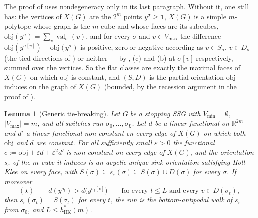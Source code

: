 \documentclass[11pt]{article}
\theoremstyle{plain}
\newtheorem{lemma}[theorem]{Lemma}
\theoremstyle{definition}
\DeclareMathOperator{\val}{val}
\newcommand{\Vmax}{V_{\max}}
\newcommand{\Vmin}{V_{\min}}
\newcommand{\bbone}{\mathbf{1}}
\begin{document}
The proof of  uses nondegeneracy only in its
last paragraph. Without it, one still has: the vertices of $X(G)$ are
the $2^{m}$ points $y^{\sigma}\ge\bbone$, $X(G)$ is a simple
$m$-polytope whose graph is the $m$-cube and whose faces are its
subcubes, $\mathrm{obj}(y^{\sigma})=\sum_v\val_\sigma(v)$, and for every
$\sigma$ and $v\in\Vmax$ the difference
$\mathrm{obj}(y^{\sigma[v]})-\mathrm{obj}(y^{\sigma})$ is positive, zero
or negative according as $v\in S_\sigma$, $v\in D_\sigma$ (the tied
directions of ) or neither --- by ,
(c) and (b) at $\sigma[v]$
respectively, summed over the vertices. So the flat classes are exactly
the maximal faces of $X(G)$ on which $\mathrm{obj}$ is constant, and
$(S,D)$ is the partial orientation $\mathrm{obj}$ induces on the graph of
$X(G)$ (bounded, by the recession argument in the proof of
).

\begin{lemma}[Generic tie-breaking]\label{lem:tie-perturb}
Let $G$ be a stopping SSG with $\Vmin=\emptyset$, $|\Vmax|=m$, and
all-switches run $\sigma_0,\dots,\sigma_L$. Let $d$ be a linear
functional on $\mathbb R^{2m}$ and $d'$ a linear functional
non-constant on every edge of $X(G)$ on which both $\mathrm{obj}$ and $d$
are constant. For all sufficiently small $\varepsilon>0$ the functional
$c:=\mathrm{obj}+\varepsilon d+\varepsilon^{2}d'$ is non-constant on every
edge of $X(G)$, and the orientation $s_\varepsilon$ of the $m$-cube it
induces is an acyclic unique sink orientation satisfying Holt--Klee on
every face, with $S(\sigma)\subseteq s_\varepsilon(\sigma)\subseteq
S(\sigma)\cup D(\sigma)$ for every $\sigma$. If moreover
\[
  (\star)\qquad d(y^{\sigma_t})>d\bigl(y^{\sigma_t[v]}\bigr)
  \qquad\text{for every }t\le L\text{ and every }v\in D(\sigma_t),
\]
then $s_\varepsilon(\sigma_t)=S(\sigma_t)$ for every $t$, the run is the
bottom-antipodal walk of $s_\varepsilon$ from $\sigma_0$, and
$L\le h^{\ast}_{\mathrm{HK}}(m)$.
\end{lemma}
\end{document}

